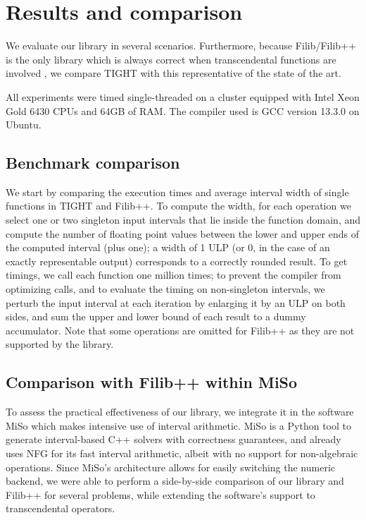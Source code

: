 \section{Results and comparison}
We evaluate our library in several scenarios. Furthermore, because Filib/Filib++ is the only library which is always correct when transcendental functions are involved \cite{tang2022}, we compare TIGHT with this representative of the state of the art.

All experiments were timed single-threaded on a cluster equipped with Intel Xeon Gold 6430 CPUs and 64GB of RAM.
The compiler used is GCC version 13.3.0 on Ubuntu.

\subsection{Benchmark comparison}
We start by comparing the execution times and average interval width of single functions in TIGHT and Filib++.
To compute the width, for each operation we select one or two singleton input intervals that lie inside the function domain, and compute the number of floating point values between the lower and upper ends of the computed interval (plus one); a width of 1 ULP (or 0, in the case of an exactly representable output) corresponds to a correctly rounded result.
To get timings, we call each function one million times; to prevent the compiler from optimizing calls, and to evaluate the timing on non-singleton intervals, we perturb the input interval at each iteration by enlarging it by an ULP on both sides, and sum the upper and lower bound of each result to a dummy accumulator.
Note that some operations are omitted for Filib++ as they are not supported by the library.



\subsection{Comparison with Filib++ within MiSo}
To assess the practical effectiveness of our library, we integrate it in the software MiSo \cite{miso} which makes intensive use of interval arithmetic.
MiSo is a Python tool to generate interval-based C++ solvers with correctness guarantees, and already uses NFG for its fast interval arithmetic, albeit with no support for non-algebraic operations.
Since MiSo's architecture allows for easily switching the numeric backend, we were able to perform a side-by-side comparison of our library and Filib++ for several problems, while extending the software's support to transcendental operators.

